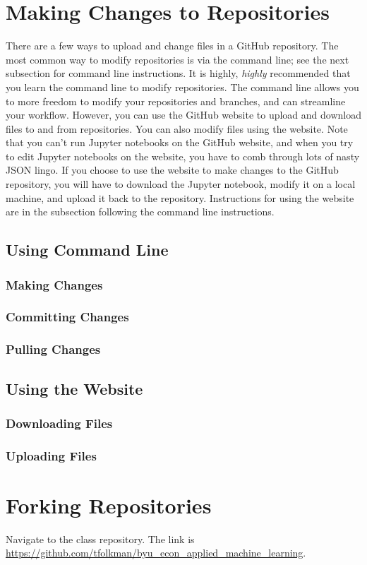 \documentclass[11pt,a4paper]{article}
\begin{document}
\section*{Making Changes to Repositories}
There are a few ways to upload and change files in a GitHub repository.
The most common way to modify repositories is via the command line; see the next subsection for command line instructions.
It is highly, \textit{highly} recommended that you learn the command line to modify repositories.
The command line allows you to more freedom to modify your repositories and branches, and can streamline your workflow.
However, you can use the GitHub website to upload and download files to and from repositories.
You can also modify files using the website.
Note that you can't run Jupyter notebooks on the GitHub website, and when you try to edit Jupyter notebooks on the website, you have to comb through lots of nasty JSON lingo.
If you choose to use the website to make changes to the GitHub repository, you will have to download the Jupyter notebook, modify it on a local machine, and upload it back to the repository.
Instructions for using the website are in the subsection following the command line instructions.

\subsection*{Using Command Line}
\subsubsection*{Making Changes}

\subsubsection*{Committing Changes}

\subsubsection*{Pulling Changes}

\subsection*{Using the Website}
\subsubsection*{Downloading Files}

\subsubsection*{Uploading Files}

\section*{Forking Repositories}
Navigate to the class repository. 
The link is \url{https://github.com/tfolkman/byu_econ_applied_machine_learning}.
\end{document}
